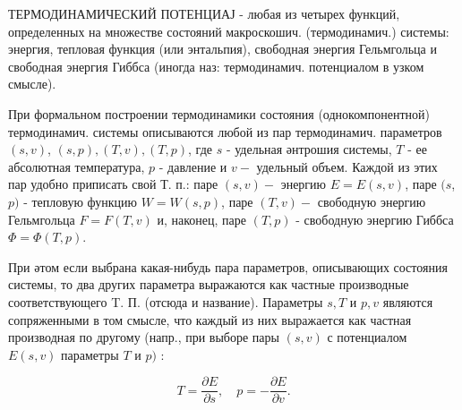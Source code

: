 \documentclass[10pt]{article}
\begin{document}
ТЕРМОДИНАМИЧЕСКИЙ ПОТЕНЦИАЈ - любая из четырех функций, определенных на множестве состояний макроскошич. (термодинамич.) системы: энергия, тепловая функция (или энтальпия), свободная энергия Гельмгольца и свободная энергия Гиббса (иногда наз: термодинамич. потенциалом в узком смысле).



При формальном построении термодинамики состояния (однокомпонентной) термодинамич. системы описываются любой из пар термодинамич. параметров $(s, v)$, $(s, p),(T, v),(T, p)$, где $s$ - удельная әнтрошия системы, $T$ - ее абсолютная температура, $p$ - давление и $v-$ удельный объем. Каждой из этих пар удобно приписать свой Т. п.: паре $(s, v)-$ энергию $E=E(s, v)$, паре $(s$, $p)$ - тепловую функцию $W=W(s, p)$, паре $(T, v)-$ свободную энергию Гельмгольца $F=F(T, v)$ и, наконец, паре $(T, p)$ - свободную энергию Гиббса $\Phi=\Phi(T, p)$.



При әтом если выбрана какая-нибудь пара параметров, описывающих состояния системы, то два других параметра выражаются как частные производные соответствующего T. П. (отсюда и название). Параметры $s, T$ и $p, v$ являются сопряженными в том смысле, что каждый из них выражается как частная производная по другому (напр., при выборе пары $(s, v)$ с потенциалом $E(s, v)$ параметры $T$ и $p)$ :



\[

T=\frac{\partial E}{\partial s}, \quad p=-\frac{\partial E}{\partial v} .

\]
\end{document}
